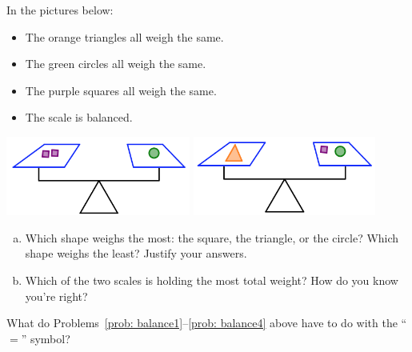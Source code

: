 \bigskip


\begin{problem}\label{prob: balance4}
In the pictures below:
\begin{itemize}
\item
The orange triangles all weigh the same.  
\item
The green circles all weigh the same.  
\item
The purple squares all weigh the same.  
\item
The scale is balanced.
\end{itemize}

\begin{center}
\includegraphics[height=2.6cm]{balance4a}\quad
\includegraphics[height=2.6cm]{balance4b}

\end{center}

\begin{enumerate}[(a)]
\item
Which shape weighs the most: the square, the triangle, or the circle?  Which shape weighs the least?  Justify your answers.\\
\item
Which of the two scales is holding the most total weight?  How do you know you're right?
\end{enumerate}


\end{problem}





\bigskip
\bigskip

\bigskip

\begin{thinkpair*}
What do Problems~\ref{prob: balance1}--\ref{prob: balance4} above have to do with the ``$=$'' symbol?  
\end{thinkpair*}



